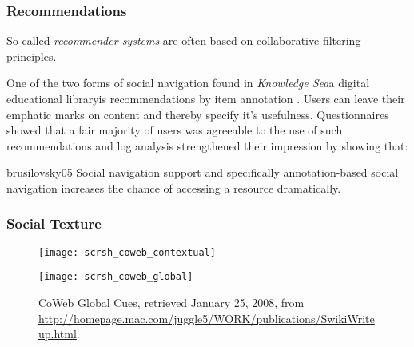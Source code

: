 \subsubsection{Recommendations}
\label{section:background.social.navigation.applied.forms.recommendations}

So called \emph{recommender systems} are often based on collaborative
filtering principles. %

One of the two forms of social navigation found in
\emph{Knowledge Sea}\dash{}a digital educational
library\dash{}is recommendations by item
annotation \citep[p.~13]{brusilovsky05}. Users can leave their emphatic marks
on content and thereby specify it's usefulness. Questionnaires showed that a
fair majority of users was agreeable to the use of such recommendations
\citeyearpar[p.~15]{brusilovsky05} and log analysis strengthened their
impression by showing that:

\begin{citequote}[p.~38]{brusilovsky05}
  Social navigation support and specifically
  annotation-based social navigation increases the chance of
  accessing a resource dramatically.
\end{citequote}

\subsubsection{Social Texture}

\begin{figure}
  \captionstyle{\raggedright}
  \begin{whole}
    \begin{minipage}[t]{0.475\wholewidth}
      \texttt{[image: scrsh\_coweb\_contextual]}
      \caption[CoWeb Contextual Cues]{%
        CoWeb Contextual Cues,
        retrieved January 25, 2008, from
        \url{http://homepage.mac.com/juggle5/WORK/publications/SwikiWriteup.html}.
      }
      \label{figure:scrsh.coweb.contextual}
    \end{minipage}
    \hfill
    \begin{minipage}[t]{0.475\wholewidth}
      \texttt{[image: scrsh\_coweb\_global]}
      \caption[CoWeb Global Cues]{%
        CoWeb Global Cues,
        retrieved January 25, 2008, from
        \url{http://homepage.mac.com/juggle5/WORK/publications/SwikiWriteup.html}.
      }
      \label{figure:scrsh.coweb.global}
    \end{minipage}
  \end{whole}
  \normalcaption
\end{figure}

